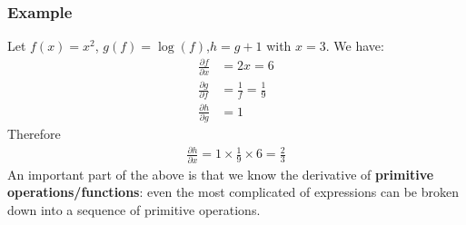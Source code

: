 \documentclass{beamer}
\theoremstyle{plain} %
\theoremstyle{example} %
\newcommand{\deriv}[2]{\ensuremath{\frac{\partial #1}{\partial #2}}}
\begin{document}
\begin{frame}
    \frametitle{Example}
    Let $f(x)=x^2$, $g(f)=\log(f)$,$h=g+1$ with $x=3$. We have:
    \begin{align*}
        \deriv{f}{x}&=2x=6\\
        \deriv{g}{f}&=\frac{1}{f}=\frac{1}{9}\\
        \deriv{h}{g}&=1
    \end{align*}
  Therefore
  \begin{align*}
    \deriv{h}{x}=1\times\frac{1}{9}\times 6=\frac{2}{3}
  \end{align*}  
An important part of the above is that we know the derivative of \textbf{primitive operations/functions}: even the most complicated of expressions can be broken down into a sequence of primitive operations.
\end{frame}
\end{document}
